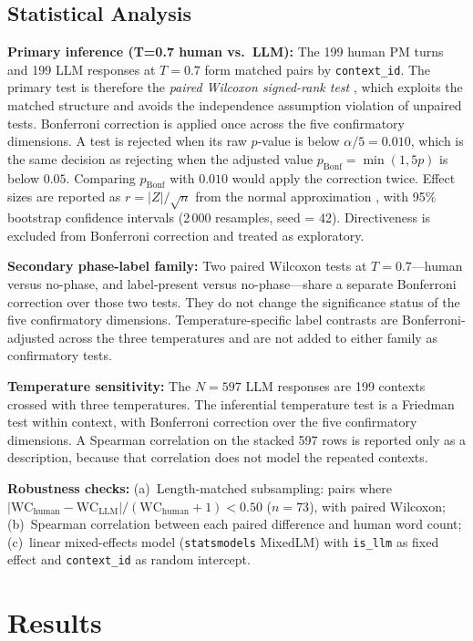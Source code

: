 \documentclass[10pt,journal,compsoc]{IEEEtran}
\begin{document}
\subsection{Statistical Analysis}\label{sec:stats}
\textbf{Primary inference (T=0.7 human vs.\ LLM):}
The 199 human PM turns and 199 LLM responses at $T = 0.7$ form matched pairs by \texttt{context\_id}. The primary test is therefore the \emph{paired Wilcoxon signed-rank test} \cite{wilcoxon1945}, which exploits the matched structure and avoids the independence assumption violation of unpaired tests. Bonferroni correction is applied once across the five confirmatory dimensions. A test is rejected when its raw $p$-value is below $\alpha/5 = 0.010$, which is the same decision as rejecting when the adjusted value $p_\text{Bonf} = \min(1, 5p)$ is below $0.05$. Comparing $p_\text{Bonf}$ with $0.010$ would apply the correction twice. Effect sizes are reported as $r = |Z|/\sqrt{n}$ from the normal approximation \cite{rosenthal1994parametric}, with 95\% bootstrap confidence intervals (2\,000 resamples, seed = 42). Directiveness is excluded from Bonferroni correction and treated as exploratory.

\textbf{Secondary phase-label family:}
Two paired Wilcoxon tests at $T = 0.7$---human versus no-phase, and label-present versus no-phase---share a separate Bonferroni correction over those two tests. They do not change the significance status of the five confirmatory dimensions. Temperature-specific label contrasts are Bonferroni-adjusted across the three temperatures and are not added to either family as confirmatory tests.

\textbf{Temperature sensitivity:}
The $N = 597$ LLM responses are 199 contexts crossed with three temperatures. The inferential temperature test is a Friedman test within context, with Bonferroni correction over the five confirmatory dimensions. A Spearman correlation on the stacked 597 rows is reported only as a description, because that correlation does not model the repeated contexts.

\textbf{Robustness checks:}
(a)~Length-matched subsampling: pairs where $|\text{WC}_\text{human} - \text{WC}_\text{LLM}|/(\text{WC}_\text{human}+1) < 0.50$ ($n = 73$), with paired Wilcoxon; (b)~Spearman correlation between each paired difference and human word count; (c)~linear mixed-effects model (\texttt{statsmodels} MixedLM) with \texttt{is\_llm} as fixed effect and \texttt{context\_id} as random intercept.

\section{Results}\label{sec:results}
\end{document}
